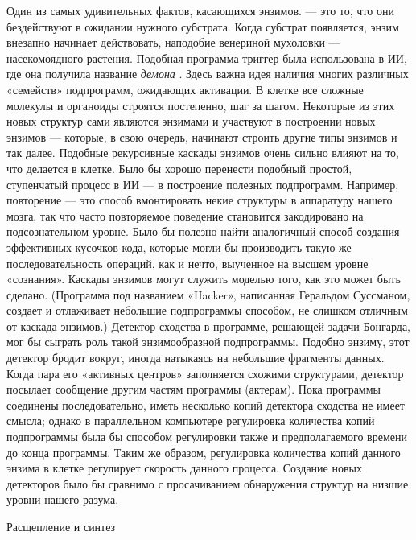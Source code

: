 \documentclass[../main.tex]{subfiles}
\begin{document}
Один из самых удивительных фактов, касающихся энзимов. --- это то, что они бездействуют в ожидании нужного субстрата. Когда субстрат появляется, энзим внезапно начинает действовать, наподобие венериной мухоловки --- насекомоядного растения. Подобная программа-триггер была использована в ИИ, где она получила название \emph{демона} . Здесь важна идея наличия многих различных «семейств» подпрограмм, ожидающих активации. В клетке все сложные молекулы и органоиды строятся постепенно, шаг за шагом. Некоторые из этих новых структур сами являются энзимами и участвуют в построении новых энзимов --- которые, в свою очередь, начинают строить другие типы энзимов и так далее. Подобные рекурсивные каскады энзимов очень сильно влияют на то, что делается в клетке. Было бы хорошо перенести подобный простой, ступенчатый процесс в ИИ --- в построение полезных подпрограмм. Например, повторение --- это способ вмонтировать некие структуры в аппаратуру нашего мозга, так что часто повторяемое поведение становится закодировано на подсознательном уровне. Было бы полезно найти аналогичный способ создания эффективных кусочков кода, которые могли бы производить такую же последовательность операций, как и нечто, выученное на высшем уровне «сознания». Каскады энзимов могут служить моделью того, как это может быть сделано. (Программа под названием «Hacker», написанная Геральдом Суссманом, создает и отлаживает небольшие подпрограммы способом, не слишком отличным от каскада энзимов.) Детектор сходства в программе, решающей задачи Бонгарда, мог бы сыграть роль такой энзимообразной подпрограммы. Подобно энзиму, этот детектор бродит вокруг, иногда натыкаясь на небольшие фрагменты данных. Когда пара его «активных центров» заполняется схожими структурами, детектор посылает сообщение другим частям программы (актерам). Пока программы соединены последовательно, иметь несколько копий детектора сходства не имеет смысла; однако в параллельном компьютере регулировка количества копий подпрограммы была бы способом регулировки также и предполагаемого времени до конца программы. Таким же образом, регулировка количества копий данного энзима в клетке регулирует скорость данного процесса. Создание новых детекторов было бы сравнимо с просачиванием обнаружения структур на низшие уровни нашего разума.

Расщепление и синтез
\end{document}
